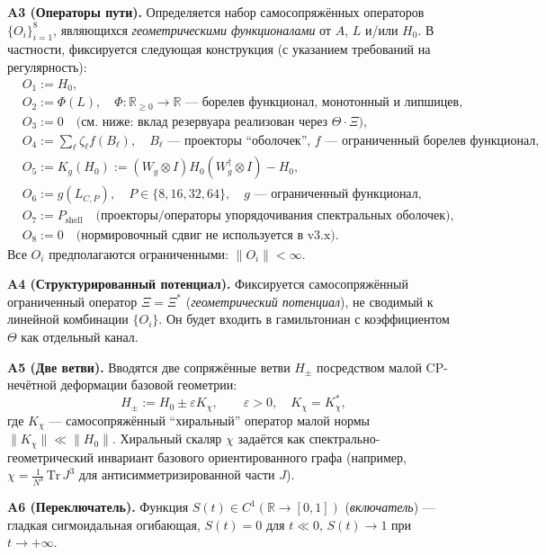 \documentclass[a4paper,12pt]{article}
\begin{document}
\textbf{A3 (Операторы пути).}
Определяется набор самосопряжённых операторов $\{O_i\}_{i=1}^8$, являющихся \emph{геометрическими функционалами} от $A$, $L$ и/или $H_0$.
В частности, фиксируется следующая конструкция (с указанием требований на регулярность):
\begin{align}
& O_1 := H_0, \label{eq:O1}\\
& O_2 := \Phi(L), \quad \Phi:\mathbb{R}_{\ge 0}\to\mathbb{R} \text{ --- борелев функционал, монотонный и липшицев}, \label{eq:O2}\\
& O_3 := 0 \quad \text{(см. ниже: вклад резервуара реализован через } \Theta\cdot\Xi\text{)}, \label{eq:O3}\\
& O_4 := \sum_{\ell} \zeta_\ell f(B_\ell), \quad B_\ell \text{ --- проекторы ``оболочек'', } f \text{ --- ограниченный борелев функционал}, \label{eq:O4}\\
& O_5 := K_g(H_0):=(W_g\otimes I)H_0(W_g^\dagger\otimes I)-H_0, \label{eq:O5}\\
& O_6 := g(L_{C,P}), \quad P\in\{8,16,32,64\}, \quad g \text{ --- ограниченный функционал}, \label{eq:O6}\\
& O_7 := P_{\text{shell}} \quad \text{(проекторы/операторы упорядочивания спектральных оболочек)}, \label{eq:O7}\\
& O_8 := 0 \quad \text{(нормировочный сдвиг не используется в v3.x).} \label{eq:O8}
\end{align}
Все $O_i$ предполагаются ограниченными: $\|O_i\|<\infty$.

\textbf{A4 (Структурированный потенциал).}
Фиксируется самосопряжённый ограниченный оператор $\Xi=\Xi^\ast$ (\emph{геометрический потенциал}), не сводимый к линейной комбинации $\{O_i\}$.
Он будет входить в гамильтониан с коэффициентом $\Theta$ как отдельный канал.

\textbf{A5 (Две ветви).}
Вводятся две сопряжённые ветви $H_\pm$ посредством малой CP-нечётной деформации базовой геометрии:
\begin{equation}
H_\pm := H_0 \pm \varepsilon K_\chi, \qquad \varepsilon>0,\quad K_\chi=K_\chi^\ast,
\end{equation}
где $K_\chi$ --- самосопряжённый ``хиральный'' оператор малой нормы $\|K_\chi\|\ll\|H_0\|$.
Хиральный скаляр $\chi$ задаётся как спектрально-геометрический инвариант базового ориентированного графа (например, $\chi=\frac{1}{N^3}\,\mathrm{Tr}\,J^3$ для антисимметризированной части $J$).

\textbf{A6 (Переключатель).}
Функция $S(t)\in C^1(\mathbb{R}\to[0,1])$ (\emph{включатель}) --- гладкая сигмоидальная огибающая, $S(t)=0$ для $t\ll 0$, $S(t)\to1$ при $t\to+\infty$.
\end{document}
